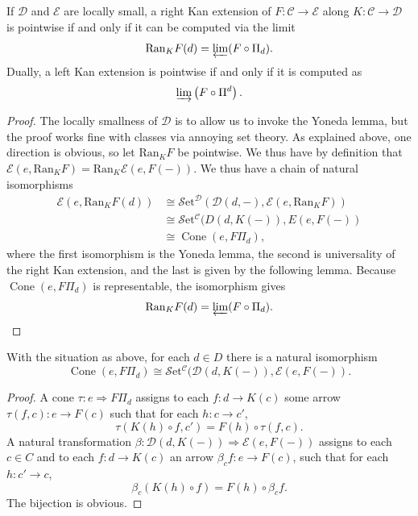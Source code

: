 \begin{theorem}\label{thm:10.4}
	If $\mathcal{D} $ and $\mathcal{E} $ are locally small, a right Kan extension of $F : \mathcal{C}  \to \mathcal{E} $ along $K : \mathcal{C}  \to \mathcal{D} $ is pointwise if and only if it can be computed via the limit
	\[
		\mathrm{Ran} _KF(d) = \varprojlim (F\circ \Pi_d)
	.\]
	Dually, a left Kan extension is pointwise if and only if it is computed as
	\[
		\varinjlim \left( F\circ \Pi^d \right) 
	.\]
\end{theorem}
\begin{proof}
	The locally smallness of $\mathcal{D} $ is to allow us to invoke the Yoneda lemma, but the proof works fine with classes via annoying set theory. As explained above, one direction is obvious, so let $\mathrm{Ran} _KF$ be pointwise. We thus have by definition that $\mathcal{E} (e,\mathrm{Ran} _KF)=\mathrm{Ran} _K \mathcal{E} (e,F(-))$. We thus have a chain of natural isomorphisms
	\begin{align*}
		\mathcal{E} (e,\mathrm{Ran} _KF(d))&\cong \mathcal{S} \mathrm{et} ^{\mathcal{D} } (\mathcal{D} (d,-),\mathcal{E} (e,\mathrm{Ran} _KF))\\
						   &\cong \mathcal{S} \mathrm{et} ^{\mathcal{C} } (D(d,K(-)),E(e,F(-))\\
						   &\cong \operatorname{Cone} (e,F\Pi_d),
	\end{align*}
	where the first isomorphism is the Yoneda lemma, the second is universality of the right Kan extension, and the last is given by the following lemma. Because $\operatorname{Cone} (e,F\Pi_d)$ is representable, the isomorphism gives
	\[
		\mathrm{Ran} _KF(d)=\varprojlim (F\circ \Pi_d)
	.\]
\end{proof}
\begin{lemma}\label{lma:10.3}
	With the situation as above, for each $d\in D$ there is a natural isomorphism
	\[
		\operatorname{Cone} (e,F\Pi_d)\cong \mathcal{S} \mathrm{et} ^\mathcal{C} (\mathcal{D} (d,K(-)),\mathcal{E} (e,F(-))
	.\]
\end{lemma}
\begin{proof}
	A cone $\tau : e \Rightarrow F\Pi_d$ assigns to each $f : d \to K(c)$ some arrow $\tau(f,c): e \to F(c)$ such that for each $h : c \to c'$,
	\[
		\tau(K(h)\circ f,c')=F(h)\circ \tau(f,c)
	.\]
	A natural transformation $\beta : \mathcal{D} (d,K(-)) \Rightarrow \mathcal{E} (e,F(-))$ assigns to each $c\in C$ and to each $f : d \to K(c)$ an arrow $\beta_c f : e \to F(c)$, such that for each $h : c' \to c$,
	\[
		\beta_{c}(K(h)\circ f)=F(h)\circ \beta_{c} f
	.\]
	The bijection is obvious.
\end{proof}

